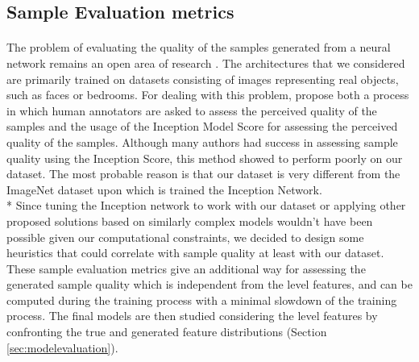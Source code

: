 \subsection{Sample Evaluation metrics}
\label{sec:evaluation}
\paragraph{} The problem of evaluating the quality of the samples generated from a neural network remains an open area of research \cite{improved_gan}. The architectures that we considered are primarily trained on datasets consisting of images representing real objects, such as faces or bedrooms. For dealing with this problem, \citeauthor{improved_gan} propose both a process in which human annotators are asked to assess the perceived quality of the samples \cite[p.~4]{improved_gan} and the usage of the Inception Model \cite{inception} Score for assessing the perceived quality of the samples. Although many authors had success in assessing sample quality using the Inception Score, this method showed to perform poorly on our dataset. The most probable reason is that our dataset is very different from the ImageNet dataset upon which is trained the Inception Network. \\* Since tuning the Inception network to work with our dataset or applying other proposed solutions based on similarly complex models wouldn't have been possible given our computational constraints, we decided to design some heuristics that could correlate with sample quality at least with our dataset. These sample evaluation metrics give an additional way for assessing the generated sample quality which is independent from the level features, and can be computed during the training process with a minimal slowdown of the training process. The final models are then studied considering the level features by confronting the true and generated feature distributions (Section \ref{sec:modelevaluation}).


